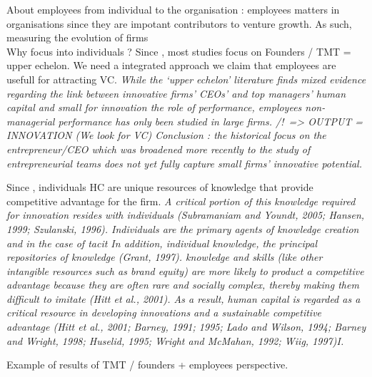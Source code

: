 
About employees from individual to the organisation : employees matters in organisations since they are impotant contributors to venture growth. As such, measuring the evolution of firms \\

Why focus into individuals ? Since \citet{andries2014small}, most studies focus on Founders / TMT = upper echelon. We need a integrated approach we claim that employees are usefull for attracting VC. \textit{While the ‘upper echelon’ literature finds mixed evidence regarding the link between innovative firms’ CEOs’ and top managers’ human capital and small for innovation the role of performance, employees non-managerial performance has only been studied in large firms. /!\ => OUTPUT = INNOVATION (We look for VC) Conclusion : the historical focus on the entrepreneur/CEO which was broadened more recently to the study of entrepreneurial teams does not yet fully capture small firms’ innovative potential.}

Since \citet{andries2014small}, individuals HC are unique resources of knowledge that provide competitive advantage for the firm. \textit{A critical portion of this knowledge required for innovation resides with individuals (Subramaniam and Youndt, 2005; Hansen, 1999; Szulanski, 1996). Individuals are the primary agents of knowledge creation and in the case of tacit In addition, individual knowledge, the principal repositories of knowledge (Grant, 1997). knowledge and skills (like other intangible resources such as brand equity) are more likely to product a competitive advantage because they are often rare and socially complex, thereby making them difficult to imitate (Hitt et al., 2001). As a result, human capital is regarded as a critical resource in developing innovations and a sustainable competitive advantage (Hitt et al., 2001; Barney, 1991; 1995; Lado and Wilson, 1994; Barney and Wright, 1998; Huselid, 1995; Wright and McMahan, 1992; Wiig, 1997)I.}

Example of results of TMT / founders + employees perspective.


